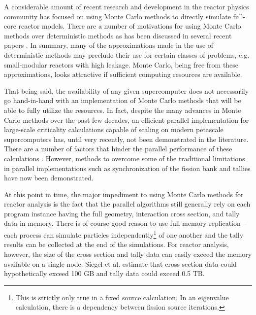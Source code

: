 \documentclass[3p]{elsarticle}
\begin{document}
A considerable amount of recent research and development in the reactor physics
community has focused on using Monte Carlo methods to directly simulate
full-core reactor models. There are a number of motivations for using Monte
Carlo methods over deterministic methods as has been discussed in several recent
papers \cite{jnet-martin-2012, jcp-siegel-2012-2}. In summary, many of the
approximations made in the use of deterministic methods may preclude their use
for certain classes of problems, e.g. small-modular reactors with high
leakage. Monte Carlo, being free from these approximations, looks attractive if
sufficient computing resources are available.

That being said, the availability of any given supercomputer does not
necessarily go hand-in-hand with an implementation of Monte Carlo methods that
will be able to fully utilize the resources. In fact, despite the many advances
in Monte Carlo methods over the past few decades, an efficient parallel
implementation for large-scale criticality calculations capable of scaling on
modern petascale supercomputers has, until very recently, not been demonstrated
in the literature. There are a number of factors that hinder the parallel
performance of these calculations \cite{jnet-martin-2012,
  pnst-brown-2011}. However, methods to overcome some of the traditional
limitations in parallel implementations such as synchronization of the fission
bank \cite{nse-romano-2012, ane-romano-2012} and tallies
\cite{trans-romano-2012} have now been demonstrated.

At this point in time, the major impediment to using Monte Carlo methods for
reactor analysis is the fact that the parallel algorithms still generally rely
on each program instance having the full geometry, interaction cross section,
and tally data in memory. There is of course good reason to use full memory
replication -- each process can simulate particles independently\footnote{This
  is strictly only true in a fixed source calculation. In an eigenvalue
  calculation, there is a dependency between fission source iterations.} of one
another and the tally results can be collected at the end of the
simulations. For reactor analysis, however, the size of the cross section and
tally data can easily exceed the memory available on a single node. Siegel et
al. \cite{jcp-siegel-2012-2} estimate that cross section data could
hypothetically exceed 100 GB and tally data could exceed 0.5 TB.
\end{document}
